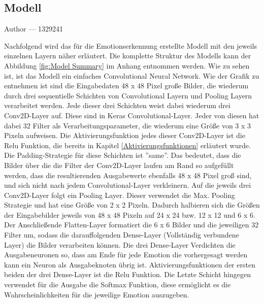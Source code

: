 \documentclass[12pt, a4paper]{report}
\makeatletter
\newcommand{\sectionauthor}[1]{%
  {\parindent0pt\vspace*{-5pt}%
  \large{Author --- }
  \linespread{1.1}\large\scshape#1%
  \par\nobreak\vspace*{35pt} }
  \@afterheading%
}
\makeatother
\begin{document}
\subsection{Modell}
\sectionauthor{1329241}
Nachfolgend wird das für die Emotionserkennung erstellte Modell mit den jeweils einzelnen Layern näher erläutert. Die komplette Struktur des Modells kann der Abbildung \ref{fig:Model Summary} im Anhang entnommen werden.
Wie zu sehen ist, ist das Modell ein einfaches Convolutional Neural Network. 
Wie der Grafik zu entnehmen ist sind die Eingabedaten 48 x 48 Pixel große Bilder, die wiederum durch drei sequentielle Schichten von Convolutional Layern und Pooling Layern verarbeitet werden. Jede dieser drei Schichten weist dabei wiederum drei Conv2D-Layer auf. Diese sind in Keras Convolutional-Layer. Jeder von diesen hat dabei 32 Filter als Verarbeitungsparameter, die wiederum eine Größe von 3 x 3 Pixeln aufweisen. Die Aktivierungsfunktion jedes dieser Conv2D-Layer ist die Relu Funktion, die bereits in Kapitel \ref{Aktivierungsfunktionen} erläutert wurde. Die Padding-Strategie für diese Schichten ist ''same''. Das bedeutet, dass die Bilder über die die Filter der Conv2D-Layer laufen am Rand so aufgefüllt werden, dass die resultierenden Ausgabewerte ebenfalls 48 x 48 Pixel groß sind, und sich nicht nach jedem  Convolutional-Layer verkleinern. Auf die jeweils drei Conv2D-Layer folgt ein Pooling Layer. Dieser verwendet die Max. Pooling Strategie und hat eine Größe von 2 x 2 Pixeln. Dadurch halbieren sich die Größen der Eingabebilder jeweils von 48 x 48 Pixeln auf 24 x 24 bzw. 12 x 12 und 6 x 6. Der Anschließende Flatten-Layer formatiert die 6 x 6 Bilder und die jeweiligen 32 Filter um, sodass die darauffolgenden Dense-Layer (Vollständig verbundene Layer) die Bilder verarbeiten können. Die drei Dense-Layer Verdichten die Ausgabeneuronen so, dass am Ende für jede Emotion die vorhergesagt werden kann ein Neuron als Ausgabeknoten übrig ist. Aktivierungsfunktionen der ersten beiden der drei Dense-Layer ist die Relu Funktion. Die Letzte Schicht hingegen verwendet für die Ausgabe die Softmax Funktion, diese ermöglicht es die Wahrscheinlichkeiten für die jeweilige Emotion auszugeben.
\end{document}
